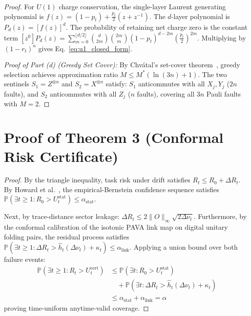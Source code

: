 \documentclass[aps,pra,twocolumn,superscriptaddress,10pt,floatfix]{revtex4-2}
\begin{document}
\begin{proof}
For $U(1)$ charge conservation, the single-layer Laurent generating polynomial is $f(z) = (1 - p_t) + \frac{p_t}{2}(z + z^{-1})$. The $d$-layer polynomial is $P_d(z) = [f(z)]^d$. The probability of retaining net charge zero is the constant term $[z^0] P_d(z) = \sum_{m=0}^{\lfloor d/2 \rfloor} \binom{d}{2m} \binom{2m}{m} (1 - p_t)^{d - 2m} (\frac{p_t}{2})^{2m}$. Multiplying by $(1 - r_t)^n$ gives Eq.~\ref{eq:u1_closed_form}.

\textit{Proof of Part (d) (Greedy Set Cover):}
By Chv\'atal's set-cover theorem~\cite{chvatal1979greedy}, greedy selection achieves approximation ratio $M \le M^* (\ln(3n) + 1)$. The two sentinels $S_1 = Z^{\otimes n}$ and $S_2 = X^{\otimes n}$ satisfy: $S_1$ anticommutes with all $X_j, Y_j$ ($2n$ faults), and $S_2$ anticommutes with all $Z_j$ ($n$ faults), covering all $3n$ Pauli faults with $M=2$.
\end{proof}

\section{Proof of Theorem 3 (Conformal Risk Certificate)}
\label{app:proof_thm3}
\begin{proof}
By the triangle inequality, task risk under drift satisfies $R_t \le R_0 + \Delta R_t$.
By Howard et al.~\cite{howard2021time}, the empirical-Bernstein confidence sequence satisfies $\mathbb{P}(\exists t \ge 1 : R_0 > U_t^{\mathrm{stat}}) \le \alpha_{\mathrm{stat}}$.

Next, by trace-distance sector leakage: $\Delta R_t \le 2 \|O\|_\infty \sqrt{2 \Delta \nu_t}$.
Furthermore, by the conformal calibration of the isotonic PAVA link map on digital unitary folding pairs, the residual process satisfies $\mathbb{P}(\exists t \ge 1 : \Delta R_t > \hat{h}_t(\Delta \nu_t) + \kappa_t) \le \alpha_{\mathrm{link}}$.
Applying a union bound over both failure events:
\begin{align}
\mathbb{P}\left( \exists t \ge 1 : R_t > U_t^{\mathrm{cert}} \right) &\le \mathbb{P}\left( \exists t : R_0 > U_t^{\mathrm{stat}} \right) \nonumber \\
&\quad + \mathbb{P}\left( \exists t : \Delta R_t > \hat{h}_t(\Delta \nu_t) + \kappa_t \right) \nonumber \\
&\le \alpha_{\mathrm{stat}} + \alpha_{\mathrm{link}} = \alpha
\end{align}
proving time-uniform anytime-valid coverage.
\end{proof}
\end{document}
